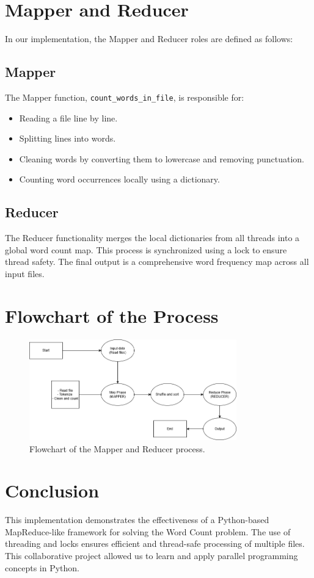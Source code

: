 \documentclass[12pt]{article}
\begin{document}
\section{Mapper and Reducer}
In our implementation, the Mapper and Reducer roles are defined as follows:

\subsection{Mapper}
The Mapper function, \texttt{count\_words\_in\_file}, is responsible for:
\begin{itemize}
    \item Reading a file line by line.
    \item Splitting lines into words.
    \item Cleaning words by converting them to lowercase and removing punctuation.
    \item Counting word occurrences locally using a dictionary.
\end{itemize}

\subsection{Reducer}
The Reducer functionality merges the local dictionaries from all threads into a global word count map. This process is synchronized using a lock to ensure thread safety. The final output is a comprehensive word frequency map across all input files.

\section{Flowchart of the Process}
\begin{figure}[h!]
\centering
\includegraphics[width=0.8\textwidth]{mapred_flowchart.png}
\caption{Flowchart of the Mapper and Reducer process.}
\label{fig:flowchart}
\end{figure}

\section{Conclusion}
This implementation demonstrates the effectiveness of a Python-based MapReduce-like framework for solving the Word Count problem. The use of threading and locks ensures efficient and thread-safe processing of multiple files. This collaborative project allowed us to learn and apply parallel programming concepts in Python.
\end{document}
